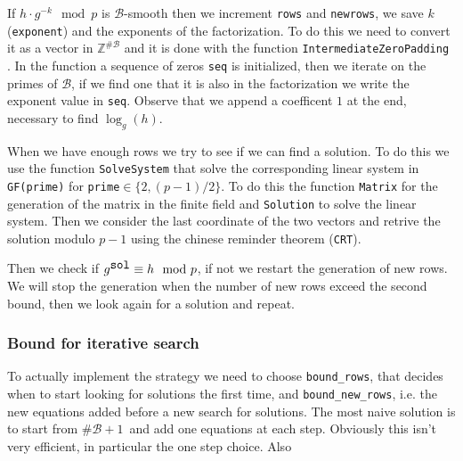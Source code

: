 \documentclass{article}
\newcommand{\ZZ}{\mathbb{Z}}
\newcommand{\BB}{\mathcal{B}}
\theoremstyle{plain}
\theoremstyle{remark}
\theoremstyle{definition}
\begin{document}
If $h\cdot g^{-k} \mod p$ is $\BB$-smooth then we increment \texttt{rows} and \texttt{newrows}, we save $k$ (\texttt{exponent}) and the exponents of the factorization. To do this we need to convert it as a vector in $\ZZ^{\#\BB}$ and it is done with the function \texttt{IntermediateZeroPadding} . In the function a sequence of zeros \texttt{seq} is initialized, then we iterate on the primes of $\BB$, if we find one that it is also in the factorization we write the exponent value in \texttt{seq}. Observe that we append a coefficent $1$ at the end, necessary to find $\log_g(h)$. 

When we have enough rows we try to see if we can find a solution. To do this we use the function \texttt{SolveSystem} that solve the corresponding linear system in \texttt{GF(prime)} for \texttt{prime}$\in \{2,(p-1)/2\}$. To do this the function \texttt{Matrix} for the generation of the matrix in the finite field and \texttt{Solution} to solve the linear system. Then we consider the last coordinate of the two vectors and retrive the solution modulo $p-1$ using the chinese reminder theorem (\texttt{CRT}). 

Then we check if $g^{\verb|sol|} \equiv h \mod p$, if not we restart the generation of new rows. We will stop the generation when the number of new rows exceed the second bound, then we look again for a solution and repeat.

\subsubsection{Bound for iterative search} \label{sssec:bounds}
To actually implement the strategy we need to choose \verb|bound_rows|, that decides when to start looking for solutions the first time, and \verb|bound_new_rows|, i.e. the new equations added before a new search for solutions. 
The most naive solution is to start from $\# \BB + 1$ and add one equations at each step. Obviously this isn't very efficient, in particular the one step choice. 
Also 
\end{document}
